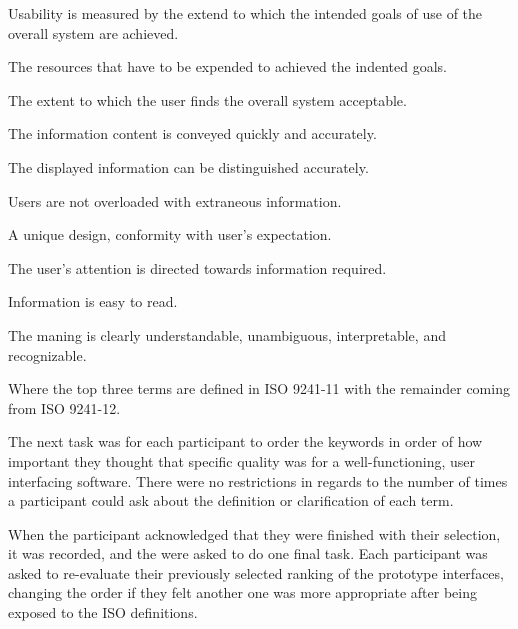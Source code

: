 \documentclass[nofilelist,dvipsnames]{cslthse-msc}
\begin{document}
{            \begin{description}[style=nextline]
              \item[Effectiveness]{
                Usability is measured by the extend to which the
                intended goals of use of the overall system are achieved.
              }
              \item[Efficiency]{
                The resources that have to be expended to achieved the indented
                goals.
              }
              \item[Satisfaction]{
                The extent to which the user finds the overall system
                acceptable.
              }
              \item[Clarity]{
                  The information content is conveyed quickly and accurately.
              }
              \item[Discriminability]{
                  The displayed information can be distinguished
                  accurately.
              }
              \item[Conciseness]{
                  Users are not overloaded with extraneous information.
              }
              \item[Consistency]{
                  A unique design, conformity with user's expectation.
              }
              \item[Detectability]{
                  The user's attention is directed towards information
                  required.
              }
              \item[Legibility]{
                  Information is easy to read.
              }
              \item[Comprehensibility]{
                  The maning is clearly understandable, unambiguous,
                  interpretable, and recognizable.
              }
            \end{description}

        Where the top three terms are defined in ISO 9241-11 with the remainder
        coming from ISO 9241-12.

        The next task was for each participant to order the keywords
        in order of how important they thought that specific quality was for a
        well-functioning, user interfacing software. There were no restrictions
        in regards to the number of times a participant could ask about the
        definition or clarification of each term.

        When the participant acknowledged that they were finished with their
        selection, it was recorded, and the were asked to do one final task.
        Each participant was asked to re-evaluate their previously selected
        ranking of the prototype interfaces, changing the order if they felt
        another one was more appropriate after being exposed to the ISO
        definitions.

}
\end{document}

